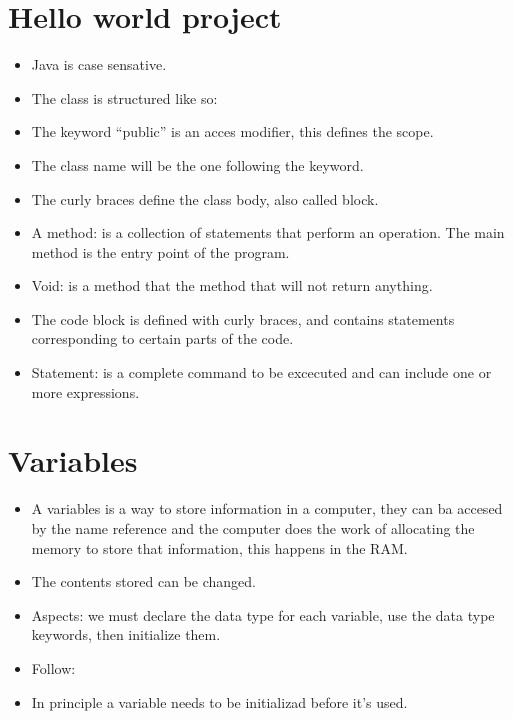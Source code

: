 \section{Hello world project}
\begin{itemize}
    \item Java is case sensative.
    \item The class is structured like so:
    
    \item The keyword ``public'' is an acces modifier, this defines the scope.
    \item The class name will be the one following the keyword.
    \item The curly braces define the class body, also called block.
    \item A method: is a collection of statements that perform an operation. The main method is the entry point of the program.
    \item Void: is a method that the method that will not return anything.
    \item The code block is defined with curly braces, and contains statements corresponding to certain parts of the code.
    \item Statement: is a complete command to be excecuted and can include one or more expressions.
\end{itemize}

\section{Variables}
\begin{itemize}
    \item A variables is a way to store information in a computer, they can ba accesed by the name reference and the computer does the work of allocating the memory to store that information, this happens in the RAM.
    \item The contents stored can be changed.
    \item Aspects: we must declare the data type for each variable, use the data type keywords, then initialize them.
    \item Follow:
    
    \item In principle a variable needs to be initializad before it's used.
\end{itemize}

